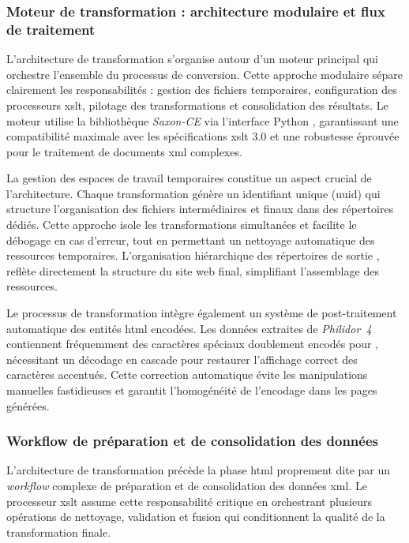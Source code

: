 \subsubsection{Moteur de transformation : architecture modulaire et flux de traitement}

L'architecture de transformation s'organise autour d'un moteur principal  qui orchestre l'ensemble du processus de conversion. Cette approche modulaire sépare clairement les responsabilités : gestion des fichiers temporaires, configuration des processeurs \gls{xslt}, pilotage des transformations et consolidation des résultats. Le moteur utilise la bibliothèque \textit{Saxon-CE} via l'interface Python , garantissant une compatibilité maximale avec les spécifications \gls{xslt} 3.0 et une robustesse éprouvée pour le traitement de documents \gls{xml} complexes.

La gestion des espaces de travail temporaires constitue un aspect crucial de l'architecture. Chaque transformation génère un identifiant unique (\gls{uuid}) qui structure l'organisation des fichiers intermédiaires et finaux dans des répertoires dédiés. Cette approche isole les transformations simultanées et facilite le débogage en cas d'erreur, tout en permettant un nettoyage automatique des ressources temporaires. L'organisation hiérarchique des répertoires de sortie ,  reflète directement la structure du site web final, simplifiant l'assemblage des ressources.

Le processus de transformation intègre également un système de post-traitement automatique des entités \gls{html} encodées. Les données extraites de \textit{Philidor~4} contiennent fréquemment des caractères spéciaux doublement encodés  pour , nécessitant un décodage en cascade pour restaurer l'affichage correct des caractères accentués. Cette correction automatique évite les manipulations manuelles fastidieuses et garantit l'homogénéité de l'encodage dans les pages générées.

\subsubsection{Workflow de préparation et de consolidation des données}

L'architecture de transformation précède la phase \gls{html} proprement dite par un \textit{\gls{workflow}} complexe de préparation et de consolidation des données \gls{xml}. Le processeur \gls{xslt}  assume cette responsabilité critique en orchestrant plusieurs opérations de nettoyage, validation et fusion qui conditionnent la qualité de la transformation finale.

